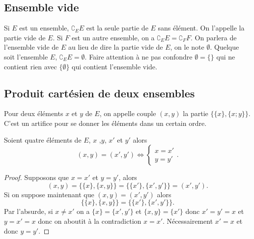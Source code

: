 \subsection{Ensemble vide}
\label{chap3-subsec:ensemblevide}

Si \(E\) est un ensemble, \(\complement_E E\) est la seule partie de \(E\) sans 
élément. On l'appelle la partie vide de \(E\). Si \(F\) est un autre ensemble, 
on a \(\complement_E E = \complement_F F\). On parlera de l'ensemble vide de 
\(E\) au lieu de dire la partie vide de \(E\), on le note \(\emptyset\). Quelque 
soit l'ensemble \(E\), \(\complement_E E =\emptyset\).
Faire attention à ne pas confondre \(\emptyset = \{\}\) qui ne contient rien 
avec \(\{\emptyset\}\) qui contient l'ensemble vide.

\subsection{Produit cartésien de deux ensembles}
\label{chap3-subsec:prodcart}

\begin{defdef}
    Pour deux éléments \(x\) et \(y\) de \(E\), on appelle couple \((x,y)\) la 
    partie \(\{\{x\},\{x;y\}\}\). C'est un artifice pour se donner les éléments dans 
    un certain ordre.
\end{defdef}

\begin{prop}
    Soient quatre éléments de \(E\), \(x\) ,\(y\), \(x'\) et \(y'\) alors 
    \begin{equation} 
        (x,y)=(x',y') \iff \begin{cases} x=x' \\ y=y' \end{cases}.
    \end{equation}
\end{prop}
\begin{proof}
    Supposons que \(x=x'\) et \(y=y'\), alors 
    \begin{equation}
        (x,y)=\{\{x\},\{x,y\}\}=\{\{x'\},\{x',y'\}\}=(x',y').
    \end{equation}
    Si on suppose maintenant que \((x,y)=(x',y')\) alors 
    \begin{equation}
        \{\{x\},\{x,y\}\}=\{\{x'\},\{x',y'\}\}.
    \end{equation}
    Par l'absurde, si \(x \neq x'\) on a \(\{x\}=\{x',y'\}\) et \(\{x,y\} = \{x'\}\) 
    donc \(x'=y'=x\) et \(y=x'=x\) donc on aboutit à la contradiction \(x=x'\). 
    Nécessairement \(x'=x\) et donc \(y=y'\).
\end{proof}

